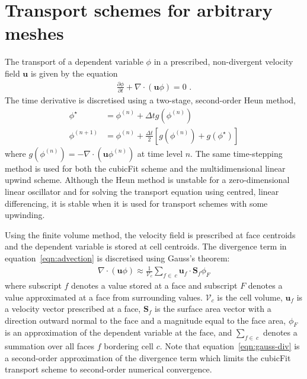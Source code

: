 \section{Transport schemes for arbitrary meshes}
\label{sec:transport}
The transport of a dependent variable $\phi$ in a prescribed, non-divergent velocity field $\mathbf{u}$ is given by the equation		
\begin{align}		
	\frac{\partial \phi}{\partial t} + \nabla \cdot \left( \mathbf{u} \phi \right) = 0 \text{ .} \label{eqn:advection}		
\end{align}
The time derivative is discretised using a two-stage, second-order Heun method,
\begin{subequations}
\begin{align}
	\phi^\star &= \phi^{(n)} + \Delta t g(\phi^{(n)}) \\
	\phi^{(n+1)} &= \phi^{(n)} + \frac{\Delta t}{2} \left[ g(\phi^{(n)}) + g(\phi^{\star}) \right]
\end{align}
\end{subequations}
where \(g(\phi^{(n)}) = - \nabla \cdot (\mathbf{u} \phi^{(n)})\) at time level \(n\).  The same time-stepping method is used for both the cubicFit scheme and the multidimensional linear upwind scheme.
Although the Heun method is unstable for a zero-dimensional linear oscillator \citep{durran2013} and for solving the transport equation using centred, linear differencing, it is stable when it is used for transport schemes with some upwinding.

Using the finite volume method, the velocity field is prescribed at face centroids and the dependent variable is stored at cell centroids.  The divergence term in equation~\eqref{eqn:advection} is discretised using Gauss's theorem:
\begin{align}
	\nabla \cdot \left( \mathbf{u} \phi \right) \approx \frac{1}{\mathcal{V}_c} \sum_{f \in\:c} \mathbf{u}_f \cdot \mathbf{S}_f \phi_F \label{eqn:gauss-div}
\end{align}
where subscript $f$ denotes a value stored at a face and subscript $F$ denotes a value approximated at a face from surrounding values.  $\mathcal{V}_c$ is the cell volume, $\mathbf{u}_f$ is a velocity vector prescribed at a face, ${\mathbf{S}_f}$ is the surface area vector with a direction outward normal to the face and a magnitude equal to the face area, $\phi_F$ is an approximation of the dependent variable at the face, and $\sum_{f \in\:c}$ denotes a summation over all faces $f$ bordering cell $c$.
Note that equation~\eqref{eqn:gauss-div} is a second-order approximation of the divergence term which limits the cubicFit transport scheme to second-order numerical convergence.

